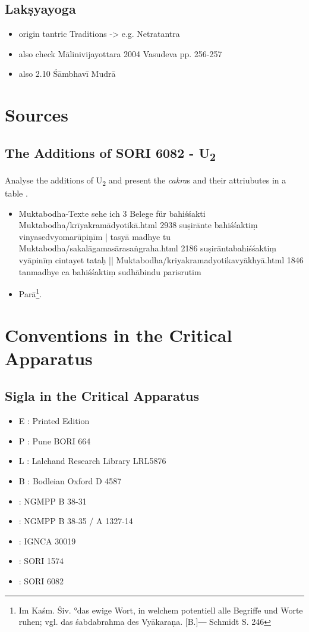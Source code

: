 \section{Lakṣyayoga}

\begin{itemize}
\item origin tantric Traditions -> e.g. Netratantra
\item also check Mālinivijayottara 2004 Vasudeva pp. 256-257
\item also  2.10 Śāmbhavī Mudrā
  \end{itemize} 

\chapter{Sources}
\section{The Additions of  SORI 6082 - U\textsubscript{2}}
\label{discussionu2}
Analyse the additions of U\textsubscript{2} and present the \textit{cakra}s and their attriubutes in a table .
\begin{itemize}
\item  Muktabodha-Texte sehe ich 3 Belege für bahiśśakti Muktabodha/krīyakramādyotikā.html 2938 suṣirānte bahiśśaktiṃ vinyasedvyomarūpiṇīm | tasyā madhye tu Muktabodha/sakalāgamasārasaṅgraha.html 2186 suṣirāntabahiśśaktiṃ vyāpinīṃ cintayet tataḥ || Muktabodha/kriyakramadyotikavyākhyā.html 1846 tanmadhye ca bahiśśaktiṃ sudhābindu parisrutim
  \item  Parā\footnote{Im Kaśm. Śiv. °das ewige Wort, in welchem potentiell alle Begriffe und Worte ruhen; vgl. das śabdabrahma des Vyākaraṇa. [B.]― Schmidt S. 246}.
  \end{itemize}

\chapter{Conventions in the Critical Apparatus}
\section{Sigla in the Critical Apparatus}

\begin{itemize}
\item E : Printed Edition
\item P : Pune BORI 664
\item L : Lalchand Research Library LRL5876
\item B : Bodleian Oxford D 4587
\item \None : NGMPP B 38-31
\item \Ntwo : NGMPP B 38-35 / A 1327-14
\item \Done : IGNCA 30019
\item \Uone : SORI 1574
\item \Utwo: SORI 6082
\end{itemize}

